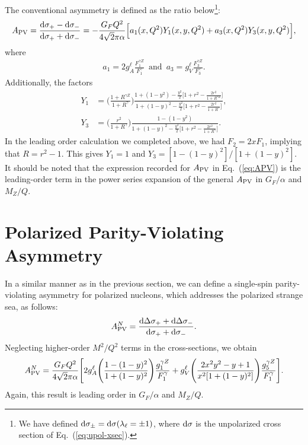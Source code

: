 \documentclass[aps,prd,amsmath,superscriptaddress,floatfix,nofootinbib]{revtex4-2}
\newcommand{\diff}[1]{{\rm d} #1}
\newcommand{\APV}{A_{\rm PV}}
\newcommand{\eref}[1]{Eq.~(\ref{eq:#1})}
\begin{document}
The conventional asymmetry is defined as the ratio below\footnote{We have defined $\diff \sigma_{\pm} = \diff \sigma(\lambda_{\ell} = \pm 1)$, where $\diff \sigma$ is the unpolarized cross section of \eref{upol-xsec}.}:
\begin{eqnarray}
    \label{eq:APV}
    \APV = \frac{\diff \sigma_{+} - \diff \sigma_{-}}{\diff \sigma_{+} + \diff \sigma_{-}} = -\frac{G_{F} Q^2}{4 \sqrt{2} \pi \alpha} \Big[ a_{1}(x,Q^2)Y_{1}(x,y,Q^2) + a_{3}(x,Q^2) Y_{3}(x,y,Q^2) \Big]
,\end{eqnarray}
where
\begin{eqnarray}
    \label{eq:a13}
    a_{1} = 2 g_{A}^{\ell} \frac{F_{1}^{\gamma Z}}{F_{1}^{\gamma}} \, \mbox{ and } \, a_{3} = g_{V}^{\ell} \frac{F_{3}^{\gamma Z}}{F_{3}^{\gamma}}
.\end{eqnarray}
Additionally, the factors
\begin{align}
    \label{eq:Y13}
    Y_{1} &= \Bigg( \frac{1 + R^{\gamma Z}}{1 + R^{\gamma}} \Bigg) \frac{1 + (1-y^2) - \frac{y^2}{2} \Big[ 1 + r^2 - \frac{2r^2}{1 + R^{\gamma Z}} \Big]}{1 + (1-y)^2 - \frac{y^2}{2}\Big[ 1 + r^2 - \frac{2r^2}{1 + R^{\gamma}} \Big]}, \\
    Y_{3} &= \Bigg( \frac{r^2}{1 + R^{\gamma}} \Bigg) \frac{1 - (1-y^2)}{1 + (1-y)^2 - \frac{y^2}{2}\Big[ 1 + r^2 - \frac{2r^2}{1 + R^{\gamma}} \Big]}
.\end{align}
In the leading order calculation we completed above, we had $F_2 = 2x F_1$, implying that $R = r^2 - 1$.
This gives $Y_{1} = 1$ and $Y_{3} = [1 - (1-y)^2]/[1 + (1-y)^2]$.
It should be noted that the expression recorded for $\APV$ in \eref{APV} is the leading-order term in the power series expansion of the general $\APV$ in $G_{F}/\alpha$ and $M_{Z} / Q$.

\section{Polarized Parity-Violating Asymmetry}

In a similar manner as in the previous section, we can define a single-spin parity-violating asymmetry for polarized nucleons, which addresses the polarized strange sea, as follows:
\begin{eqnarray}
    \label{eq:APV-pol}
    A_{\rm PV}^{N} = \frac{\diff{\Delta \sigma_{+}} + \diff{\Delta \sigma_{-}}}{\diff \sigma_{+} + \diff \sigma_{-}}
.\end{eqnarray}
Neglecting higher-order $M^2/Q^2$ terms in the cross-sections, we obtain
\begin{eqnarray}
    \label{eq:APV-pol-explicit}
    A_{\rm PV}^{N} = \frac{G_{F} Q^2}{4 \sqrt{2} \pi \alpha} \Bigg[ 2g_{A}^{\ell} \Bigg( \frac{1 - (1 - y)^2}{1 + (1 - y)^2} \Bigg) \frac{g_1^{\gamma Z}}{F_1^{\gamma}} + g_{V}^{\ell} \Bigg( \frac{2x^2y^2 - y + 1}{x^2[ 1 + (1-y)^2 ]} \Bigg) \frac{g_{5}^{\gamma Z}}{F_1^{\gamma}} \Bigg]
.\end{eqnarray}
Again, this result is leading order in $G_{F}/\alpha$ and $M_{Z}/Q$.
\end{document}
